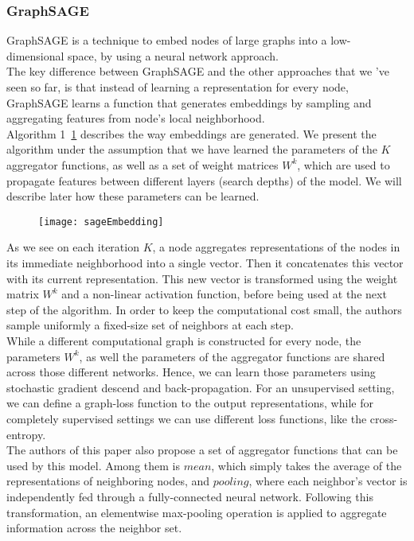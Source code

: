 \subsubsection*{GraphSAGE}
GraphSAGE \cite{inductive} is a technique to embed nodes of large graphs into a
low-dimensional space, by using a neural network approach.\\
The key difference between GraphSAGE and the other approaches that we 've seen
so far, is that instead of learning a representation for every node, GraphSAGE
learns a function that generates embeddings by sampling and aggregating features
from node's local neighborhood.\\
 Algorithm 1~\ref{algo} describes the way
embeddings are generated. We present the algorithm under the assumption that
we have learned the parameters of the $K$ aggregator functions, as well as a
set of weight matrices $W^k$, which are used to propagate features between
different layers (search depths) of the model. We will describe later how these
parameters can be learned.
\begin{figure}[h!tb]
\texttt{[image: sageEmbedding]}
\label{algo}
\end{figure}
As we see on each iteration $K$, a node aggregates representations of the nodes
in its immediate neighborhood into a single vector. Then it concatenates this
vector with its current representation. This new vector is transformed using the weight matrix
$W^k$ and a non-linear activation function, before being used at the next step
of the algorithm. In order to keep the computational cost small, the authors
sample uniformly a fixed-size set of neighbors at each step.\\
 While a different computational graph is
constructed for every node, the parameters $W^k$, as well the parameters of the
aggregator functions are shared across those different networks. Hence, we can
learn those parameters using stochastic gradient descend and back-propagation.
For an unsupervised setting, we can define a graph-loss function to the output
representations, while for completely supervised settings we can use different
loss functions, like the cross-entropy.\\
 The authors of this paper also propose a set of
aggregator functions that can be used by this model. Among them is $mean$, which
simply takes the average of the representations of neighboring nodes, and
$pooling$, where each neighbor's vector is independently fed through a
fully-connected neural network. Following this transformation, an elementwise
max-pooling operation is applied to aggregate information across the neighbor
set.

